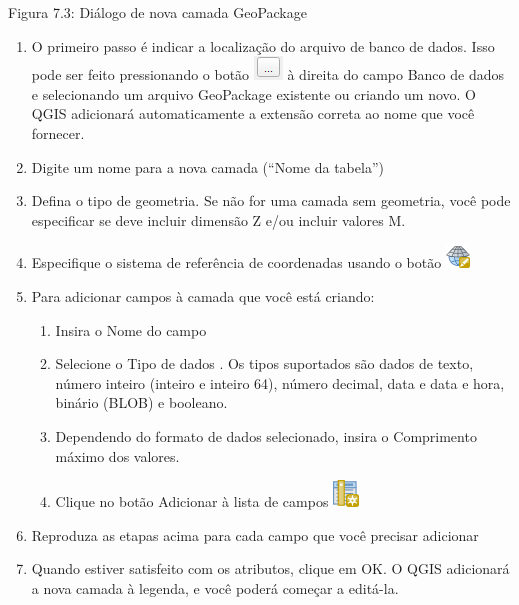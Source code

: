 \documentclass[
]{krantz}
\providecommand{\tightlist}{%
  \setlength{\itemsep}{0pt}\setlength{\parskip}{0pt}}
\begin{document}
Figura 7.3: Diálogo de nova camada GeoPackage

\begin{enumerate}
\def\labelenumi{\arabic{enumi}.}
\setcounter{enumi}{1}
\item
  O primeiro passo é indicar a localização do arquivo de banco de dados. Isso pode ser feito pressionando o botão \includegraphics{media/modulo7/database-file-location.png} à direita do campo Banco de dados e selecionando um arquivo GeoPackage existente ou criando um novo. O QGIS adicionará automaticamente a extensão correta ao nome que você fornecer.
\item
  Digite um nome para a nova camada (``Nome da tabela'')
\item
  Defina o tipo de geometria. Se não for uma camada sem geometria, você pode especificar se deve incluir dimensão Z e/ou incluir valores M.
\item
  Especifique o sistema de referência de coordenadas usando o botão \includegraphics{media/modulo7/mActionSetProjection.png}
\item
  Para adicionar campos à camada que você está criando:

  \begin{enumerate}
  \def\labelenumii{\arabic{enumii}.}
  \tightlist
  \item
    Insira o Nome do campo
  \item
    Selecione o Tipo de dados . Os tipos suportados são dados de texto, número inteiro (inteiro e inteiro 64), número decimal, data e data e hora, binário (BLOB) e booleano.
  \item
    Dependendo do formato de dados selecionado, insira o Comprimento máximo dos valores.
  \item
    Clique no botão Adicionar à lista de campos \includegraphics{media/modulo7/mActionNewAttribute.png}
  \end{enumerate}
\item
  Reproduza as etapas acima para cada campo que você precisar adicionar
\item
  Quando estiver satisfeito com os atributos, clique em OK. O QGIS adicionará a nova camada à legenda, e você poderá começar a editá-la.
\end{enumerate}
\end{document}
